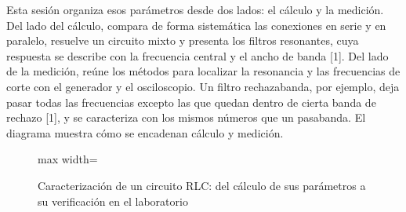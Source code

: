 \documentclass[11pt,letterpaper]{article}
\begin{document}
Esta sesión organiza esos parámetros desde dos lados: el cálculo y la medición. Del lado del cálculo, compara de forma sistemática las conexiones en serie y en paralelo, resuelve un circuito mixto y presenta los filtros resonantes, cuya respuesta se describe con la frecuencia central y el ancho de banda [1]. Del lado de la medición, reúne los métodos para localizar la resonancia y las frecuencias de corte con el generador y el osciloscopio. Un filtro rechazabanda, por ejemplo, deja pasar todas las frecuencias excepto las que quedan dentro de cierta banda de rechazo [1], y se caracteriza con los mismos números que un pasabanda. El diagrama muestra cómo se encadenan cálculo y medición.

\begin{figure}[H]
  \centering
  \begin{adjustbox}{max width=\linewidth}
  \end{adjustbox}
  \caption{Caracterización de un circuito RLC: del cálculo de sus parámetros a su verificación en el laboratorio}
\end{figure}
\end{document}
